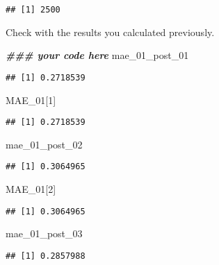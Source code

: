 \documentclass[
]{article}
\newenvironment{Shaded}{\begin{snugshade}}{\end{snugshade}}
\newcommand{\DecValTok}[1]{\textcolor[rgb]{0.00,0.00,0.81}{#1}}
\newcommand{\DocumentationTok}[1]{\textcolor[rgb]{0.56,0.35,0.01}{\textbf{\textit{#1}}}}
\newcommand{\NormalTok}[1]{#1}
\begin{document}
\begin{verbatim}
## [1] 2500
\end{verbatim}

Check with the results you calculated previously.

\begin{Shaded}
\begin{Highlighting}[]
\DocumentationTok{\#\#\# your code here}
\NormalTok{mae\_01\_post\_01}
\end{Highlighting}
\end{Shaded}

\begin{verbatim}
## [1] 0.2718539
\end{verbatim}

\begin{Shaded}
\begin{Highlighting}[]
\NormalTok{MAE\_01[}\DecValTok{1}\NormalTok{]}
\end{Highlighting}
\end{Shaded}

\begin{verbatim}
## [1] 0.2718539
\end{verbatim}

\begin{Shaded}
\begin{Highlighting}[]
\NormalTok{mae\_01\_post\_02}
\end{Highlighting}
\end{Shaded}

\begin{verbatim}
## [1] 0.3064965
\end{verbatim}

\begin{Shaded}
\begin{Highlighting}[]
\NormalTok{MAE\_01[}\DecValTok{2}\NormalTok{]}
\end{Highlighting}
\end{Shaded}

\begin{verbatim}
## [1] 0.3064965
\end{verbatim}

\begin{Shaded}
\begin{Highlighting}[]
\NormalTok{mae\_01\_post\_03}
\end{Highlighting}
\end{Shaded}

\begin{verbatim}
## [1] 0.2857988
\end{verbatim}
\end{document}
